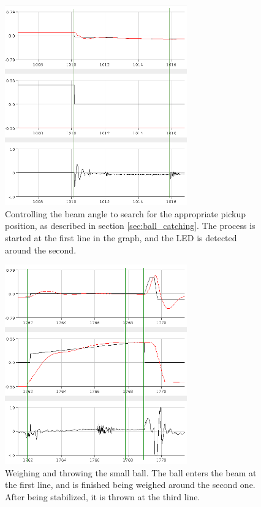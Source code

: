 \begin{figure}[h]
\centering
\includegraphics[width=0.7\textwidth]{figures/topickupposition-crop.png}
\caption{Controlling the beam angle to search for the appropriate pickup position, as described in section \ref{sec:ball_catching}. The process is started at the first line in the graph, and the LED is detected around the second.}
\label{fig:topickupposition}
\end{figure}

\begin{figure}[h]
\centering
\includegraphics[width=0.7\textwidth]{figures/weighandthrowsmallball-crop.png}
\caption{Weighing and throwing the small ball. The ball enters the beam at the first line, and is finished being weighed around the second one. After being stabilized, it is thrown at the third line.}
\label{fig:weighandthrowsmallball}
\end{figure}

